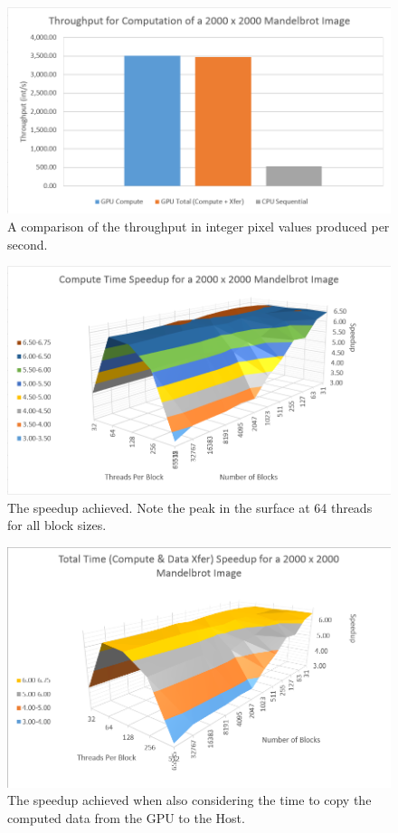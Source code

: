 \documentclass{article}
\begin{document}
  \begin{figure}[h!]
    \centering
    \includegraphics[width=.9\linewidth]{throughput}
    \caption{A comparison of the throughput in integer pixel values produced per second.}
    \label{fig:throughput}
  \end{figure}

  \begin{figure}[h!]
    \centering
    \includegraphics[width=.9\linewidth]{compute_speedup}
    \caption{The speedup achieved. Note the peak in the surface at 64 threads for all block sizes.}
    \label{fig:compute_speedup}
  \end{figure}

  \begin{figure}[h!]
    \centering
    \includegraphics[width=.9\linewidth]{total_speedup}
    \caption{The speedup achieved when also considering the time to copy the computed data from the GPU to the Host.}
    \label{fig:total_speedup}
  \end{figure}
\end{document}
